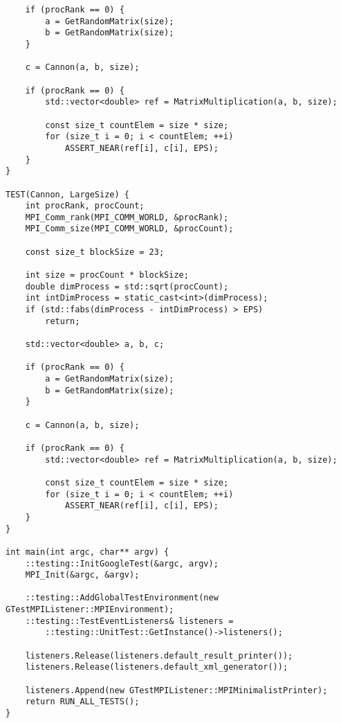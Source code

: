 \documentclass{report}
\begin{document}
\begin{lstlisting}
    if (procRank == 0) {
        a = GetRandomMatrix(size);
        b = GetRandomMatrix(size);
    }

    c = Cannon(a, b, size);

    if (procRank == 0) {
        std::vector<double> ref = MatrixMultiplication(a, b, size);

        const size_t countElem = size * size;
        for (size_t i = 0; i < countElem; ++i)
            ASSERT_NEAR(ref[i], c[i], EPS);
    }
}

TEST(Cannon, LargeSize) {
    int procRank, procCount;
    MPI_Comm_rank(MPI_COMM_WORLD, &procRank);
    MPI_Comm_size(MPI_COMM_WORLD, &procCount);

    const size_t blockSize = 23;

    int size = procCount * blockSize;
    double dimProcess = std::sqrt(procCount);
    int intDimProcess = static_cast<int>(dimProcess);
    if (std::fabs(dimProcess - intDimProcess) > EPS)
        return;

    std::vector<double> a, b, c;

    if (procRank == 0) {
        a = GetRandomMatrix(size);
        b = GetRandomMatrix(size);
    }

    c = Cannon(a, b, size);

    if (procRank == 0) {
        std::vector<double> ref = MatrixMultiplication(a, b, size);

        const size_t countElem = size * size;
        for (size_t i = 0; i < countElem; ++i)
            ASSERT_NEAR(ref[i], c[i], EPS);
    }
}

int main(int argc, char** argv) {
    ::testing::InitGoogleTest(&argc, argv);
    MPI_Init(&argc, &argv);

    ::testing::AddGlobalTestEnvironment(new GTestMPIListener::MPIEnvironment);
    ::testing::TestEventListeners& listeners =
        ::testing::UnitTest::GetInstance()->listeners();

    listeners.Release(listeners.default_result_printer());
    listeners.Release(listeners.default_xml_generator());

    listeners.Append(new GTestMPIListener::MPIMinimalistPrinter);
    return RUN_ALL_TESTS();
}

\end{lstlisting}
\end{document}
